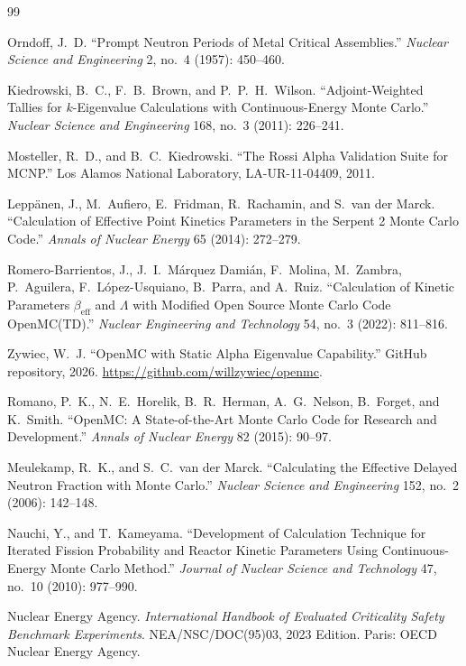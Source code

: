 \documentclass[12pt,preprint]{elsarticle}
\begin{document}
\begin{thebibliography}{99}

Orndoff, J.\ D. ``Prompt Neutron Periods of Metal Critical Assemblies.'' \textit{Nuclear Science and Engineering} 2, no.\ 4 (1957): 450--460.

Kiedrowski, B.\ C., F.\ B.\ Brown, and P.\ P.\ H.\ Wilson. ``Adjoint-Weighted Tallies for $k$-Eigenvalue Calculations with Continuous-Energy Monte Carlo.'' \textit{Nuclear Science and Engineering} 168, no.\ 3 (2011): 226--241.

Mosteller, R.\ D., and B.\ C.\ Kiedrowski. ``The Rossi Alpha Validation Suite for MCNP.'' Los Alamos National Laboratory, LA-UR-11-04409, 2011.

Lepp\"anen, J., M.\ Aufiero, E.\ Fridman, R.\ Rachamin, and S.\ van der Marck. ``Calculation of Effective Point Kinetics Parameters in the Serpent 2 Monte Carlo Code.'' \textit{Annals of Nuclear Energy} 65 (2014): 272--279.

Romero-Barrientos, J., J.\ I.\ M\'arquez Dami\'an, F.\ Molina, M.\ Zambra, P.\ Aguilera, F.\ L\'opez-Usquiano, B.\ Parra, and A.\ Ruiz. ``Calculation of Kinetic Parameters $\beta_{\mathrm{eff}}$ and $\Lambda$ with Modified Open Source Monte Carlo Code OpenMC(TD).'' \textit{Nuclear Engineering and Technology} 54, no.\ 3 (2022): 811--816.

Zywiec, W.\ J. ``OpenMC with Static Alpha Eigenvalue Capability.'' GitHub repository, 2026. \url{https://github.com/willzywiec/openmc}.

Romano, P.\ K., N.\ E.\ Horelik, B.\ R.\ Herman, A.\ G.\ Nelson, B.\ Forget, and K.\ Smith. ``OpenMC: A State-of-the-Art Monte Carlo Code for Research and Development.'' \textit{Annals of Nuclear Energy} 82 (2015): 90--97.

Meulekamp, R.\ K., and S.\ C.\ van der Marck. ``Calculating the Effective Delayed Neutron Fraction with Monte Carlo.'' \textit{Nuclear Science and Engineering} 152, no.\ 2 (2006): 142--148.

Nauchi, Y., and T.\ Kameyama. ``Development of Calculation Technique for Iterated Fission Probability and Reactor Kinetic Parameters Using Continuous-Energy Monte Carlo Method.'' \textit{Journal of Nuclear Science and Technology} 47, no.\ 10 (2010): 977--990.

Nuclear Energy Agency. \textit{International Handbook of Evaluated Criticality Safety Benchmark Experiments}. NEA/NSC/DOC(95)03, 2023 Edition. Paris: OECD Nuclear Energy Agency.


\end{thebibliography}
\end{document}
